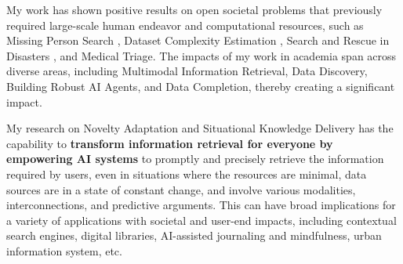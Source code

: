 


My work has shown positive results on open societal problems that previously required large-scale human endeavor and computational resources, such as Missing Person Search \cite{solaiman2021applying}, Dataset Complexity Estimation \cite{solaiman2023domainComplexity}, Search and Rescue in Disasters \cite{solaiman2013avra}, and Medical Triage. The impacts of my work in academia span across diverse areas, including Multimodal Information Retrieval, Data Discovery, Building Robust AI Agents, and Data Completion, thereby creating a significant impact.

My research on Novelty Adaptation and Situational Knowledge Delivery has the capability to \textbf{transform information retrieval for everyone by empowering AI systems }to promptly and precisely retrieve the information required by users, even in situations where the resources are minimal, data sources are in a state of constant change, and involve various modalities, interconnections, and predictive arguments.
This can have broad implications for a variety of applications with societal and user-end impacts, including contextual search engines, digital libraries, AI-assisted journaling and mindfulness, urban information system, etc.


    